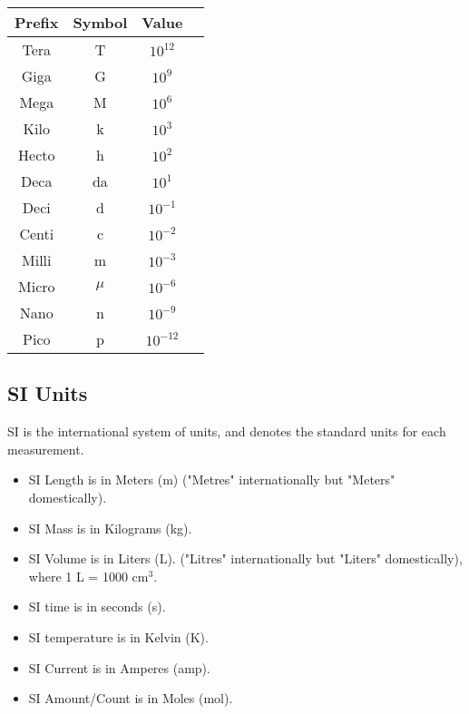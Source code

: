 
\begin{table}[H]
\centering
\begin{tabular}{|c|c|c|c|}
\hline
Prefix & Symbol & Value \\
\hline
Tera & T & $10^{12}$ \\
\hline
Giga & G & $10^{9}$ \\
\hline
Mega & M & $10^{6}$ \\
\hline
Kilo & k & $10^{3}$ \\
\hline
Hecto & h & $10^{2}$ \\
\hline
Deca & da & $10^{1}$ \\
\hline
Deci & d & $10^{-1}$ \\
\hline
Centi & c & $10^{-2}$ \\
\hline
Milli & m & $10^{-3}$ \\
\hline
Micro & $\mu$ & $10^{-6}$ \\
\hline
Nano & n & $10^{-9}$ \\
\hline
Pico & p & $10^{-12}$ \\
\hline
\end{tabular}
\end{table}


\subsection{SI Units}

SI is the international system of units, and denotes the standard units for each measurement.

\begin{itemize}
	\item SI Length is in Meters (m) ("Metres" internationally but "Meters" domestically).
	\item SI Mass is in Kilograms (kg). 
	\item SI Volume is in Liters (L). ("Litres" internationally but "Liters" domestically), where 1 L = 1000 $\mathrm{cm^{3}}$.
	\item SI time is in seconds (s).
	\item SI temperature is in Kelvin (K).
	\item SI Current is in Amperes (amp).
	\item SI Amount/Count is in Moles (mol).
\end{itemize}


